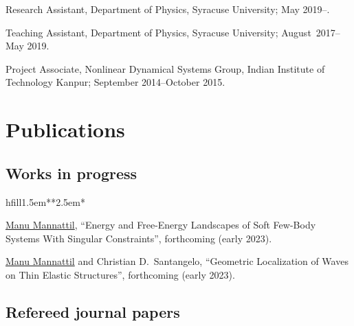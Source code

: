 \documentclass[10pt,article,oneside]{memoir}
\def\bname{\underline{Manu Mannattil}}    %
\begin{document}
Research Assistant, Department of Physics, Syracuse University; May 2019--.

Teaching Assistant, Department of Physics, Syracuse University; August~2017--May 2019.

Project Associate, Nonlinear Dynamical Systems Group, Indian Institute of Technology Kanpur; September 2014--October 2015.


\section{Publications}

\subsection{Works in progress}

\begin{flexlabelled}{hfill}{1.5em}{*}{*}{2.5em}{*}
  \setlength{\itemsep}{-0.25em}
  \item[2.] {\bname}, ``Energy and Free-Energy Landscapes of Soft Few-Body Systems With Singular Constraints'', forthcoming (early 2023).
  \item[1.] {\bname} and Christian D.~Santangelo, ``Geometric Localization of Waves on Thin Elastic Structures'', forthcoming (early 2023).
\end{flexlabelled}

\subsection{Refereed journal papers}
\end{document}

